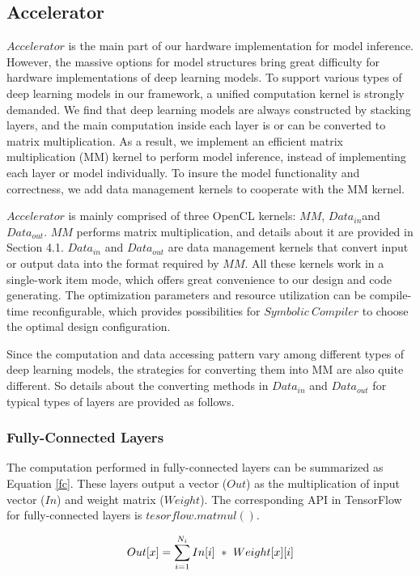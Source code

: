\documentclass{acm_proc_article-sp-copy}
\begin{document}
\subsection{Accelerator}
$Accelerator$ is the main part of our hardware implementation for model inference. However, the massive options for model structures bring great difficulty for hardware implementations of deep learning models. To support various types of deep learning models in our framework, a unified computation kernel is strongly demanded. We find that deep learning models are always constructed by stacking layers, and the main computation inside each layer is or can be converted to matrix multiplication. As a result, we implement an efficient matrix multiplication (MM) kernel to perform model inference, instead of implementing each layer or model individually. To insure the model functionality and correctness, we add data management kernels to cooperate with the MM kernel.

$Accelerator$ is mainly comprised of three OpenCL kernels: $MM$, $Data_{in}$and $Data_{out}$. $MM$ performs matrix multiplication, and details about it are provided in Section 4.1. $Data_{in}$ and $Data_{out}$ are data management kernels that convert input or output data into the format required by $MM$. All these kernels work in a single-work item mode, which offers great convenience to our design and code generating. The optimization parameters and resource utilization can be compile-time reconfigurable, which provides possibilities for $Symbolic\ Compiler$ to choose the optimal design configuration.

Since the computation and data accessing pattern vary among different types of deep learning models, the strategies for converting them into MM are also quite different. So details about the converting methods in $Data_{in}$ and $Data_{out}$ for typical types of layers are provided as follows. 

\subsubsection{Fully-Connected Layers}
The computation performed in fully-connected layers can be summarized as Equation \ref{fc}. These layers output a vector ($Out$) as the multiplication of input vector ($In$) and weight matrix ($Weight$). The corresponding API in TensorFlow for fully-connected layers is $tesorflow.matmul()$.

\begin{equation}
\centering
Out[x]=\sum_{i=1}^{N_i}In[i]\ *\ Weight[x][i]
\label{fc}
\end{equation}
\end{document}
